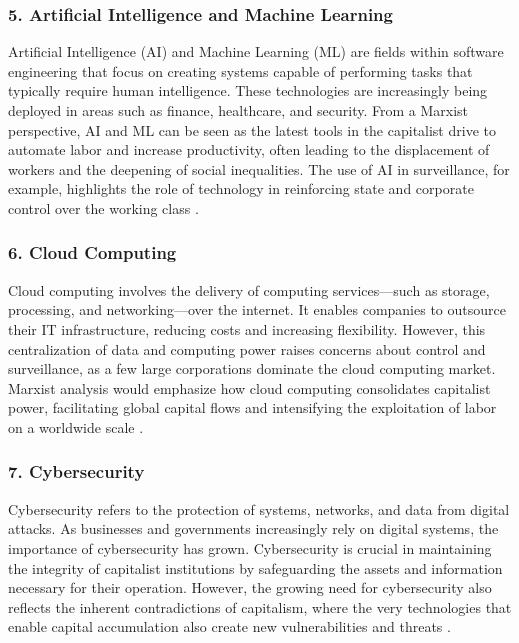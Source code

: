 \begin{refsection}
\begin{multicols}{2}
{\subsubsection*{5. Artificial Intelligence and Machine Learning}
Artificial Intelligence (AI) and Machine Learning (ML) are fields within software engineering that focus on creating systems capable of performing tasks that typically require human intelligence. These technologies are increasingly being deployed in areas such as finance, healthcare, and security. From a Marxist perspective, AI and ML can be seen as the latest tools in the capitalist drive to automate labor and increase productivity, often leading to the displacement of workers and the deepening of social inequalities. The use of AI in surveillance, for example, highlights the role of technology in reinforcing state and corporate control over the working class \cite{eubanks2018automating}.

\subsubsection*{6. Cloud Computing}
Cloud computing involves the delivery of computing services—such as storage, processing, and networking—over the internet. It enables companies to outsource their IT infrastructure, reducing costs and increasing flexibility. However, this centralization of data and computing power raises concerns about control and surveillance, as a few large corporations dominate the cloud computing market. Marxist analysis would emphasize how cloud computing consolidates capitalist power, facilitating global capital flows and intensifying the exploitation of labor on a worldwide scale \cite{moore2015capitalism}.

\subsubsection*{7. Cybersecurity}
Cybersecurity refers to the protection of systems, networks, and data from digital attacks. As businesses and governments increasingly rely on digital systems, the importance of cybersecurity has grown. Cybersecurity is crucial in maintaining the integrity of capitalist institutions by safeguarding the assets and information necessary for their operation. However, the growing need for cybersecurity also reflects the inherent contradictions of capitalism, where the very technologies that enable capital accumulation also create new vulnerabilities and threats \cite{fuchs2020national}.


}
\end{multicols}
\end{refsection}
